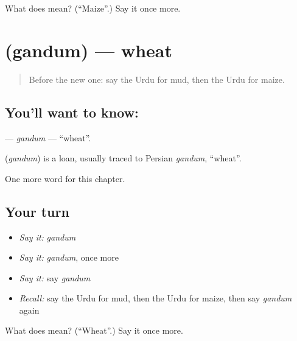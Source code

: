 \begin{tcolorbox}[breakable,colback=teal!4,colframe=teal!35!black,title={Before you move on}]
What does  mean? (\textquotedblleft{}Maize\textquotedblright{}.) Say it once more.
\end{tcolorbox}
\section[\texorpdfstring{\ur{گندم} (gandum)}{گندم (gandum)}]{ (gandum) — wheat}

\label{lesson:UR-C174-gandum}



\begin{quote}
Before the new one: say the Urdu for mud, then the Urdu for maize.
\end{quote}

\subsection*{You'll want to know: }
\textbf{} — \emph{gandum} — \textquotedblleft{}wheat\textquotedblright{}.

\begin{cousinweb}
\textbf{} (\emph{gandum}) is a loan, usually traced to Persian \emph{gandum}, \textquotedblleft{}wheat\textquotedblright{}.
\end{cousinweb}

\begin{grammarlens}[title={What you've built}]
One more word for this chapter.
\end{grammarlens}

\subsection*{Your turn}
\begin{itemize}
\raggedright
  \item \emph{Say it:} \emph{gandum}
  \item \emph{Say it:} \emph{gandum}, once more
  \item \emph{Say it:} say \emph{gandum}
  \item \emph{Recall:} say the Urdu for mud, then the Urdu for maize, then say \emph{gandum} again
\end{itemize}

\begin{tcolorbox}[breakable,colback=teal!4,colframe=teal!35!black,title={Before you move on}]
What does  mean? (\textquotedblleft{}Wheat\textquotedblright{}.) Say it once more.
\end{tcolorbox}
